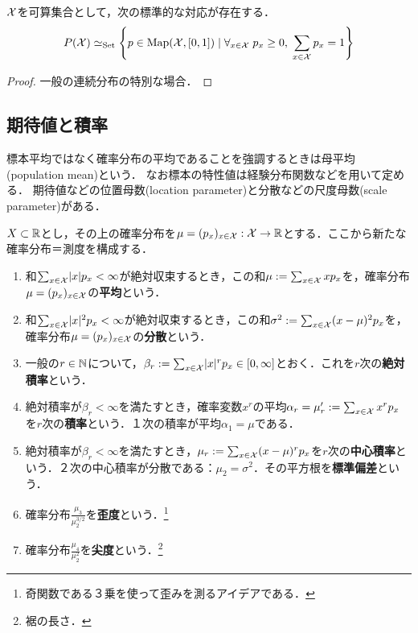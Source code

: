 \documentclass[uplatex,dvipdfmx]{jsreport}
\begin{document}
\begin{lemma}
    $\mathcal{X}$を可算集合として，次の標準的な対応が存在する．
    \[P(\mathcal{X})\simeq_{\mathrm{Set}}\left\{p\in\mathrm{Map}(\mathcal{X},[0,1])\mid\forall_{x\in\mathcal{X}}\;p_x\ge 0,\;\sum_{x\in\mathcal{X}}p_x=1\right\}\]
\end{lemma}
\begin{proof}
    一般の連続分布の特別な場合．
\end{proof}

\subsection{期待値と積率}

\begin{tcolorbox}[colframe=ForestGreen, colback=ForestGreen!10!white,breakable,colbacktitle=ForestGreen!40!white,coltitle=black,fonttitle=\bfseries\sffamily,
title=]
    標本平均ではなく確率分布の平均であることを強調するときは母平均(population mean)という．
    なお標本の特性値は経験分布関数などを用いて定める．
    期待値などの位置母数(location parameter)と分散などの尺度母数(scale parameter)がある．
\end{tcolorbox}

\begin{definition}
    $X\subset\mathbb{R}$とし，その上の確率分布を$\mu=(p_x)_{x\in\mathcal{X}}:\mathcal{X}\to\mathbb{R}$とする．ここから新たな確率分布＝測度を構成する．
    \begin{enumerate}
        \item 和$\sum_{x\in\mathcal{X}}\lvert x\rvert p_x<\infty$が絶対収束するとき，この和$\mu:=\sum_{x\in\mathcal{X}}xp_x$を，確率分布$\mu=(p_x)_{x\in\mathcal{X}}$の\textbf{平均}という．
        \item 和$\sum_{x\in\mathcal{X}}\lvert x\rvert^2p_x<\infty$が絶対収束するとき，この和$\sigma^2:=\sum_{x\in\mathcal{X}}(x-\mu)^2p_x$を，確率分布$\mu=(p_x)_{x\in\mathcal{X}}$の\textbf{分散}という．
        \item 一般の$r\in\mathbb{N}$について，$\beta_r:=\sum_{x\in\mathcal{X}}\lvert x\rvert^rp_x\in[0,\infty]$とおく．これを$r$次の\textbf{絶対積率}という．
        \item 絶対積率が$\beta_r<\infty$を満たすとき，確率変数$x^r$の平均$\alpha_r=\mu'_r:=\sum_{x\in\mathcal{X}}x^rp_x$を$r$次の\textbf{積率}という．１次の積率が平均$\alpha_1=\mu$である．
        \item 絶対積率が$\beta_r<\infty$を満たすとき，$\mu_r:=\sum_{x\in\mathcal{X}}(x-\mu)^rp_x$を$r$次の\textbf{中心積率}という．２次の中心積率が分散である：$\mu_2=\sigma^2$．その平方根を\textbf{標準偏差}という．
        \item 確率分布$\frac{\mu_3}{\mu_2^{3/2}}$を\textbf{歪度}という．\footnote{奇関数である３乗を使って歪みを測るアイデアである．}
        \item 確率分布$\frac{\mu_4}{\mu_2^2}$を\textbf{尖度}という．\footnote{裾の長さ．}
    \end{enumerate}
\end{definition}
\end{document}

